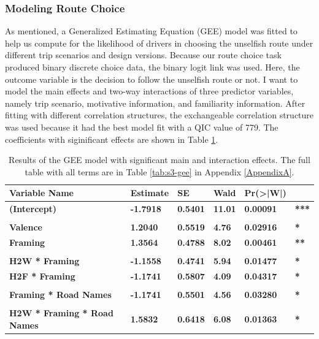 \subsubsection{Modeling Route Choice}
As mentioned, a Generalized Estimating Equation (GEE) model was fitted to help us compute for the likelihood of drivers in choosing the unselfish route under different trip scenarios and design versions. Because our route choice task produced binary discrete choice data, the binary logit link was used. Here, the outcome variable is the decision to follow the unselfish route or not. I want to model the main effects and two-way interactions of three predictor variables, namely trip scenario, motivative information, and familiarity information. After fitting with different correlation structures, the exchangeable correlation structure was used because it had the best model fit with a QIC\cite{pan2001akaike} value of 779. The coefficients with siginificant effects are shown in Table \ref{tab:s3-gee-significant}. 

\begin{table}[t]
    \caption{Results of the GEE model with significant main and interaction effects. The full table with all terms are in Table \ref{tab:s3-gee} in Appendix \ref{AppendixA}.}
	\label{tab:s3-gee-significant}
	\centering
	\begin{tabular}{llllll}
        \hline\hline
        Variable Name & Estimate & SE & Wald & Pr(\textgreater{}|W|) & \\
        \hline
        \textbf{(Intercept)} & \textbf{-1.7918} & \textbf{0.5401} & \textbf{11.01} & \textbf{0.00091} & \textbf{***} \\
        & & & & & \\
        \textbf{Valence} & \textbf{1.2040} & \textbf{0.5519} & \textbf{4.76} & \textbf{0.02916} & \textbf{*}  \\
        \textbf{Framing} & \textbf{1.3564} & \textbf{0.4788} & \textbf{8.02} & \textbf{0.00461} & \textbf{**} \\ 
        & & & & & \\
        \textbf{H2W * Framing} & \textbf{-1.1558} & \textbf{0.4741} & \textbf{5.94} & \textbf{0.01477} & \textbf{*}  \\
        \textbf{H2F * Framing} & \textbf{-1.1741} & \textbf{0.5807} & \textbf{4.09} & \textbf{0.04317} & \textbf{*}  \\
        & & & & & \\
        \textbf{Framing * Road Names} & \textbf{-1.1741} & \textbf{0.5501} & \textbf{4.56}  & \textbf{0.03280} & \textbf{*}   \\
        & & & & & \\
        \textbf{H2W * Framing * Road Names} & \textbf{1.5832} & \textbf{0.6418} & \textbf{6.08}  & \textbf{0.01363} & \textbf{*}   \\
        \hline
    \end{tabular}
\end{table}

